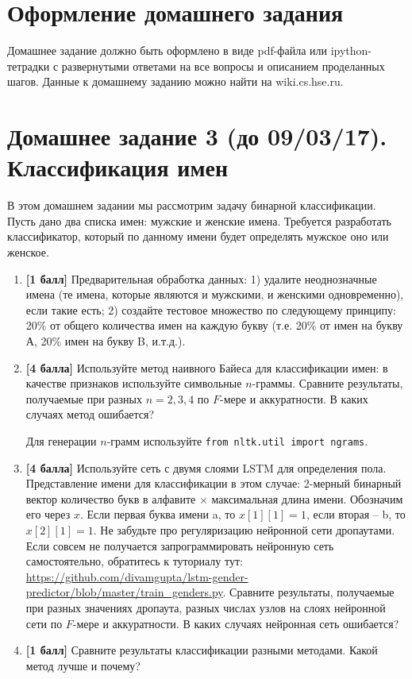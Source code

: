 \documentclass[11pt]{article}
\begin{document}
\section*{Оформление домашнего задания}
Домашнее задание должно быть оформлено в виде pdf-файла или ipython-тетрадки с развернутыми ответами на все вопросы и описанием проделанных шагов. Данные к домашнему заданию можно найти на wiki.cs.hse.ru.



\section*{Домашнее задание 3 (до \textbf{09/03/17)}. Классификация имен}

В этом домашнем задании мы рассмотрим задачу бинарной классификации. Пусть дано два списка имен: мужские и женские имена. Требуется разработать классификатор, который по данному имени будет определять мужское оно или женское. 

\begin{enumerate}
\item \textbf{[1 балл]} Предварительная обработка данных: 1) удалите неоднозначные имена (те имена, которые являются и мужскими, и женскими одновременно), если такие есть; 2) создайте тестовое множество по следующему принципу: 20\% от общего количества имен на каждую букву (т.е. 20\% от имен на букву  А, 20\% имен на букву B, и.т.д.).


\item \textbf{[4 балла]} Используйте метод наивного Байеса для классификации имен: в качестве признаков используйте символьные $n$-граммы. Сравните результаты, получаемые при разных $n=2,3,4$ по $F$-мере и аккуратности. В каких случаях метод ошибается?

Для генерации $n$-грамм используйте \texttt{from nltk.util import ngrams}.


\item \textbf{[4 балла]} Используйте сеть с двумя слоями LSTM для определения пола. Представление имени для классификации в этом случае: 2-мерный бинарный вектор количество букв в алфавите $\times$ максимальная длина имени. Обозначим его через $x$. Если первая буква имени a, то $x[1][1] = 1$, если вторая – b, то  $x[2][1] = 1$. Не забудьте про регуляризацию нейронной сети дропаутами. Если совсем не получается запрограммировать нейронную сеть самостоятельно, обратитесь к туториалу тут: \url{https://github.com/divamgupta/lstm-gender-predictor/blob/master/train\_genders.py}. Сравните результаты, получаемые при разных значениях дропаута, разных числах узлов на слоях нейронной сети по $F$-мере и аккуратности. В каких случаях нейронная сеть ошибается?


\item \textbf{[1 балл]} Сравните результаты классификации разными методами. Какой метод лучше и почему?

\end{enumerate}
\end{document}
